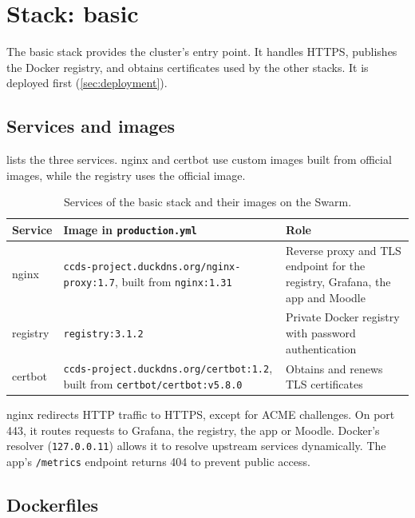 \section{Stack: basic}
\label{sec:stack-basic}

The basic stack provides the cluster's entry point. It handles HTTPS,
publishes the Docker registry, and obtains certificates used by the
other stacks. It is deployed first (\cref{sec:deployment}).

\subsection{Services and images}

 lists the three services. nginx and certbot
use custom images built from official images, while the registry uses
the official image.

\begin{table}[htbp]
  \centering
  \caption{Services of the basic stack and their images on the Swarm.}
  \label{tab:basic-services}
  \small
  \begin{tabular}{l>{\raggedright\arraybackslash}p{50mm}>{\raggedright\arraybackslash}p{58mm}}
    \toprule
    Service  & Image in \texttt{production.yml} & Role \\
    \midrule
    nginx    & \texttt{ccds-project.duckdns.org/\allowbreak nginx-proxy:1.7},
               built from \texttt{nginx:1.31}
             & Reverse proxy and TLS endpoint for the registry, Grafana,
               the app and Moodle \\
    registry & \texttt{registry:3.1.2}
             & Private Docker registry with password authentication \\
    certbot  & \texttt{ccds-project.duckdns.org/\allowbreak certbot:1.2},
               built from \texttt{certbot/certbot:v5.8.0}
             & Obtains and renews TLS certificates \\
    \bottomrule
  \end{tabular}
\end{table}

nginx redirects HTTP traffic to HTTPS, except for ACME challenges.
On port 443, it routes requests to Grafana, the registry, the app or
Moodle. Docker's resolver (\texttt{127.0.0.11}) allows it to resolve
upstream services dynamically. The app's \texttt{/metrics} endpoint
returns 404 to prevent public access.

\subsection{Dockerfiles}

